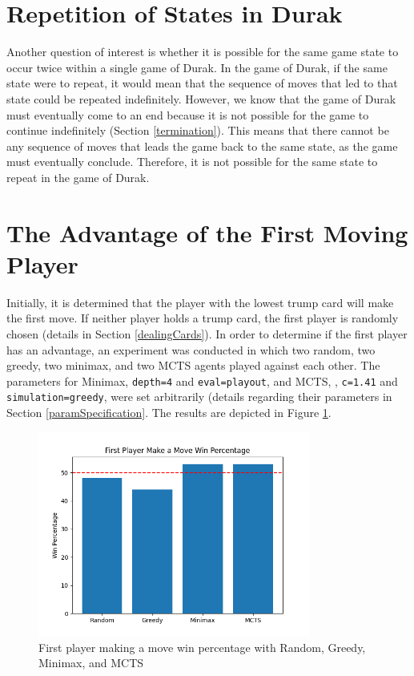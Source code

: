\section{Repetition of States in Durak}
Another question of interest is whether it is possible for the same game state to occur twice within a single game of Durak. In the game of Durak, if the same state were to repeat, it would mean that the sequence of moves that led to that state could be repeated indefinitely. However, we know that the game of Durak must eventually come to an end because it is not possible for the game to continue indefinitely (Section \ref{termination}). This means that there cannot be any sequence of moves that leads the game back to the same state, as the game must eventually conclude. Therefore, it is not possible for the same state to repeat in the game of Durak.

\section{The Advantage of the First Moving Player}

Initially, it is determined that the player with the lowest trump card will make the first move. If neither player holds a trump card, the first player is randomly chosen (details in Section \ref{dealingCards}). In order to determine if the first player has an advantage, an experiment was conducted in which two random, two greedy, two minimax, and two MCTS agents played against each other. The parameters for Minimax, \texttt{depth=4} and \texttt{eval=playout}, and MCTS, , \texttt{c=1.41} and \texttt{simulation=greedy}, were set arbitrarily (details regarding their parameters in Section \ref{paramSpecification}. The results are depicted in Figure \ref{firstmoveadvantage}.

\begin{figure}[h]
  \centering
  \captionsetup{justification=centering}
  \includegraphics[width=0.8\textwidth]{../img/advantage.png}
  \caption{First player making a move win percentage with Random, Greedy, Minimax, and MCTS}
  \label{firstmoveadvantage}
\end{figure}

